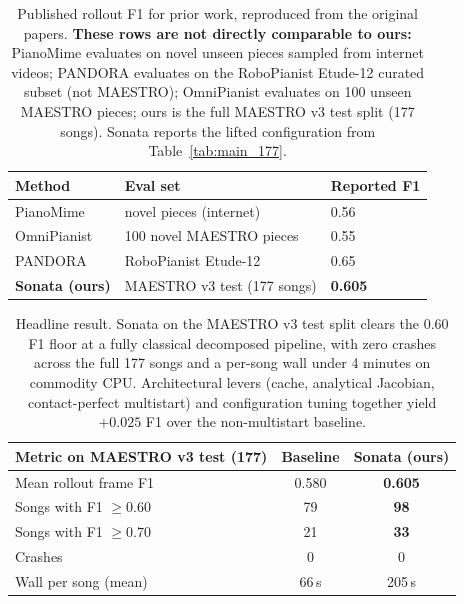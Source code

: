 \begin{table}[t]
\centering
\caption{Published rollout F1 for prior work, reproduced from the original
papers. \textbf{These rows are not directly comparable to ours:} PianoMime
evaluates on novel unseen pieces sampled from internet videos;
PANDORA evaluates on the RoboPianist Etude-12 curated subset (not MAESTRO);
OmniPianist evaluates on 100 unseen MAESTRO pieces; ours is the full
MAESTRO v3 test split (177 songs). Sonata reports the lifted configuration
from Table~\ref{tab:main_177}.}
\label{tab:external_baselines}
\begin{tabular}{lll}
\toprule
Method                          & Eval set                     & Reported F1 \\
\midrule
PianoMime~\cite{pianomime}      & novel pieces (internet)      & 0.56 \\
OmniPianist~\cite{omnipianist}  & 100 novel MAESTRO pieces     & 0.55 \\
PANDORA~\cite{pandora}          & RoboPianist Etude-12         & 0.65 \\
\midrule
\textbf{Sonata (ours)}          & MAESTRO v3 test (177 songs)  & \textbf{0.605} \\
\bottomrule
\end{tabular}
\end{table}


\begin{table}[t]
\centering
\caption{Headline result. Sonata on the MAESTRO v3 test split clears the
0.60 F1 floor at a fully classical decomposed pipeline, with zero crashes
across the full 177 songs and a per-song wall under 4 minutes on commodity
CPU. Architectural levers (cache, analytical Jacobian, contact-perfect
multistart) and configuration tuning together yield $+0.025$ F1 over the
non-multistart baseline.}
\label{tab:headline}
\begin{tabular}{lcc}
\toprule
Metric on MAESTRO v3 test (177)     & Baseline & Sonata (ours) \\
\midrule
Mean rollout frame F1                & 0.580 & \textbf{0.605} \\
Songs with F1 $\geq 0.60$            & 79  & \textbf{98}  \\
Songs with F1 $\geq 0.70$            & 21  & \textbf{33}  \\
Crashes                              & 0   & 0   \\
Wall per song (mean)                 & 66\,s & 205\,s \\
\bottomrule
\end{tabular}
\end{table}
